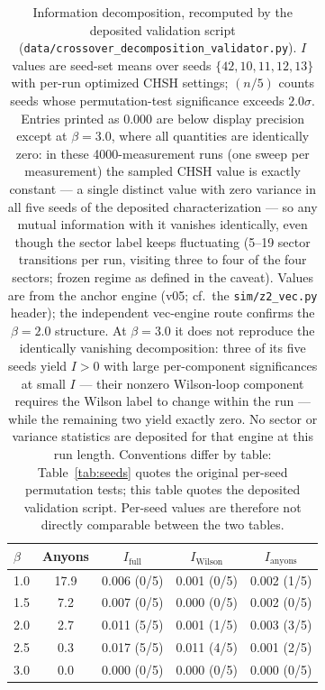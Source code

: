 \documentclass[aps,pra,twocolumn,superscriptaddress,showpacs,floatfix]{revtex4-2}
\begin{document}
\begin{table}[b]
\caption{Information decomposition, recomputed by the deposited validation
script (\texttt{data/crossover\_decomposition\_validator.py}). $I$ values are
seed-set means over seeds $\{42, 10, 11, 12, 13\}$ with per-run optimized CHSH
settings; $(n/5)$ counts seeds whose permutation-test significance exceeds
$2.0\sigma$. Entries printed as $0.000$ are below display precision except at
$\beta = 3.0$, where all quantities are identically zero: in these
4000-measurement runs (one sweep per measurement) the sampled CHSH value is
exactly constant --- a single distinct value with zero variance in all five
seeds of the deposited characterization --- so any mutual information with it
vanishes identically, even though the sector label keeps fluctuating (5--19
sector transitions per run, visiting three to four of the four sectors; frozen
regime as defined in the caveat). Values are from the anchor engine
(v05; cf.\ the \texttt{sim/z2\_vec.py} header); the independent vec-engine
route confirms the $\beta = 2.0$ structure. At $\beta = 3.0$ it does not
reproduce the identically vanishing decomposition: three of its five seeds
yield $I > 0$ with large per-component significances at small $I$ --- their
nonzero Wilson-loop component requires the Wilson label to change within the
run --- while the remaining two yield exactly zero. No sector or variance
statistics are deposited for that engine at this run length. Conventions
differ by table: Table~\ref{tab:seeds} quotes the original per-seed permutation
tests; this table quotes the deposited validation script. Per-seed values are
therefore not directly comparable between the two tables.}
\label{tab:crossover}
\begin{ruledtabular}
\begin{tabular}{lcccc}
$\beta$ & Anyons & $I_\mathrm{full}$ & $I_\mathrm{Wilson}$ & $I_\mathrm{anyons}$ \\
\midrule
1.0 & 17.9 & 0.006 (0/5) & 0.001 (0/5) & 0.002 (1/5) \\
1.5 &  7.2 & 0.007 (0/5) & 0.000 (0/5) & 0.002 (0/5) \\
2.0 &  2.7 & 0.011 (5/5) & 0.001 (1/5) & 0.003 (3/5) \\
2.5 &  0.3 & 0.017 (5/5) & 0.011 (4/5) & 0.001 (2/5) \\
3.0 &  0.0 & 0.000 (0/5) & 0.000 (0/5) & 0.000 (0/5) \\
\end{tabular}
\end{ruledtabular}
\end{table}
\end{document}
